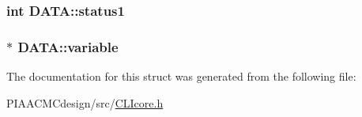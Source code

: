\hypertarget{structDATA_acc1a46fa384934e24a89660d8d0c9f7a}{
\subsubsection[{status1}]{\setlength{\rightskip}{0pt plus 5cm}int D\+A\+T\+A\+::status1}}\label{structDATA_acc1a46fa384934e24a89660d8d0c9f7a}
\hypertarget{structDATA_a106c7aa0d14584d90aa925257e99d368}{
\subsubsection[{variable}]{ $\ast$ D\+A\+T\+A\+::variable}}\label{structDATA_a106c7aa0d14584d90aa925257e99d368}


The documentation for this struct was generated from the following file\+:\begin{DoxyCompactItemize}
\item 
P\+I\+A\+A\+C\+M\+Cdesign/src/\hyperlink{PIAACMCdesign_2src_2CLIcore_8h}{C\+L\+Icore.\+h}\end{DoxyCompactItemize}
